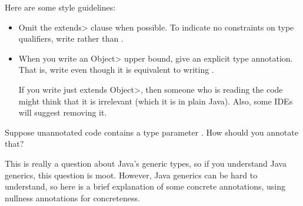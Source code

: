Here are some style guidelines:
\begin{itemize}
\item
  Omit the \<extends> clause when possible.  To indicate no constraints on
  type qualifiers, write  rather than .
\item
  When you write an \<Object> upper bound, give an explicit type annotation.
  That is, write  even though it is equivalent to writing
  .

  If you write just \<extends Object>, then someone who is reading the code
  might think that it is irrelevant (which it is in plain Java).  Also,
  some IDEs will suggest removing it.
\end{itemize}



Suppose unannotated code contains a type parameter .  How should
you annotate that?

This is really a question about Java's generic types, so if you understand
Java generics, this question is moot.  However, Java generics can be hard
to understand, so here is a brief explanation of some concrete annotations,
using nullness annotations for concreteness.

